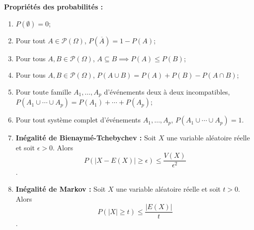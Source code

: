 \documentclass{article}
\begin{document}
\begin{itemize}
\textbf{Propriétés des probabilités :}
\begin{enumerate}
    \item \( P(\emptyset) = 0 \);
    \item Pour tout \( A \in \mathcal{P}(\Omega) \), \( P(\overline{A}) = 1 - P(A) \);
    \item Pour tous \( A, B \in \mathcal{P}(\Omega) \), \( A \subseteq B \implies P(A) \leq P(B) \);
    \item Pour tous \( A, B \in \mathcal{P}(\Omega) \), \( P(A \cup B) = P(A) + P(B) - P(A \cap B) \);
    \item Pour toute famille \( A_1, \ldots, A_p \) d'événements deux à deux incompatibles, 
          \( P(A_1 \cup \cdots \cup A_p) = P(A_1) + \cdots + P(A_p) \);
    \item Pour tout système complet d'événements \( A_1, \ldots, A_p \), \( P(A_1 \cup \cdots \cup A_p) = 1 \).
	\item \textbf{Inégalité de Bienaymé-Tchebychev :} Soit \( X \) une variable aléatoire réelle et soit \( \epsilon > 0 \). Alors 
\[ P(|X - E(X)| \geq \epsilon) \leq \frac{V(X)}{\epsilon^2} \].
	\item \textbf{Inégalité de Markov :} Soit \( X \) une variable aléatoire réelle et soit \( t > 0 \). Alors
\[ P(|X| \geq t) \leq \frac{|E(X)|}{t} \].

\end{enumerate}



\end{itemize}
\end{document}
